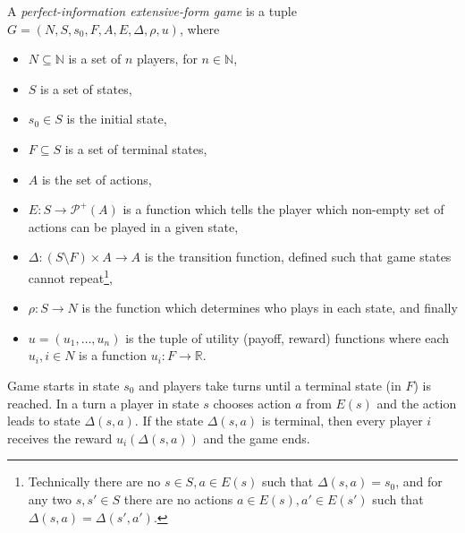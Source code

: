 \begin{definition}
    A {\em perfect-information extensive-form game}
    is a tuple $G = (N, S, s_0, F, A, E, \Delta, \rho, u)$,
    where
    \begin{itemize}
        \item $N \subseteq \mathbb{N}$ is a set of $n$ players,
            for $n \in \mathbb{N}$,
        \item $S$ is a set of states,
        \item $s_0 \in S$ is the initial state,
        \item $F \subseteq S$ is a set of terminal states,
        \item $A$ is the set of actions,
        \item $E : S \to \mathcal{P}^+(A)$ is a function which tells the player
            which non-empty set of actions can be played in a given state,
        \item $\Delta : (S \setminus F) \times A \to A$ is the
            transition function, defined such that game states cannot
            repeat\footnote{
                Technically there are no $s \in S, a \in E(s)$ such that
                $\Delta(s,a) = s_0$, and for any two $s,s' \in S$ there
                are no actions $a \in E(s), a' \in E(s')$ such that
                $\Delta(s,a) = \Delta(s',a')$.
            },
        \item $\rho : S \to N$ is the function which determines who plays in each state,
            and finally
        \item $u = (u_1,\ldots,u_{n})$ is the tuple of
            utility (payoff, reward) functions where each $u_i, i \in N$
            is a function $u_i : F \to \mathbb{R}$.
    \end{itemize}
\end{definition}

Game starts in state $s_0$ and players take turns until
a terminal state (in $F$) is reached. In a turn a player in state $s$
chooses action $a$ from $E(s)$ and the action leads to state
$\Delta(s,a)$.  If the state $\Delta(s,a)$ is terminal, then every
player $i$ receives the reward $u_i(\Delta(s,a))$ and the game ends.

